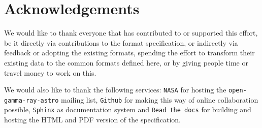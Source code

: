 \section{Acknowledgements}

We would like to thank everyone that has contributed to or supported this
effort, be it directly via contributions to the format specification, or
indirectly via feedback or adopting the existing formats, spending the
effort to transform their existing data to the common formats defined here, or by giving people time or travel money to work on this.

We would also like to thank the following services: \texttt{NASA} for hosting the \texttt{open-gamma-ray-astro} mailing list, \texttt{Github} for making this way of online collaboration possible, \texttt{Sphinx} as documentation system and \texttt{Read the docs} for building and hosting the HTML and PDF version of the specification.
